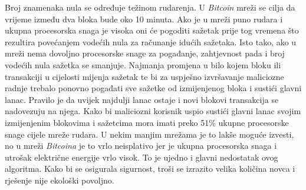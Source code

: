 \documentclass[times, utf8, zavrsni, numeric]{fer}
\begin{document}
Broj znamenaka nula se određuje težinom rudarenja. U \emph{Bitcoin} mreži se cilja da vrijeme između dva bloka bude oko 10 minuta.
Ako je u mreži puno rudara i ukupna procesorska snaga je visoka oni će pogoditi sažetak prije tog vremena što rezultira povećanjem vodećih nula za računanje idućih sažetaka. 
Isto tako, ako u mreži nema dovoljno procesorske snage za pogađanje, zahtjevnost pada i broj vodećih nula sažetka se smanjuje. 
Najmanja promjena u bilo kojem bloku ili transakciji u cijelosti mijenja sažetak te bi za uspješno izvršavanje maliciozne radnje
trebalo ponovno pogađati sve sažetke od izmijenjenog bloka i sustići glavni lanac. Pravilo je da uvijek najdulji lanac ostaje i novi blokovi transakcija se nadovezuju na njega.
Kako bi maliciozni korisnik uspio sustići glavni lanac svojim izmijenjenim blokovima i sažetcima mora imati preko 51\% ukupne procesorske snage cijele mreže rudara.
U nekim manjim mrežama je to lakše moguće izvesti, no u mreži \emph{Bitcoina} je to vrlo neisplativo jer je ukupna procesorska snaga i utrošak električne energije vrlo visok.
To je ujedno i glavni nedostatak ovog algoritma. Kako bi se osigurala sigurnost, troši se izrazito velika količina novca i rješenje nije ekološki povoljno.
\end{document}
